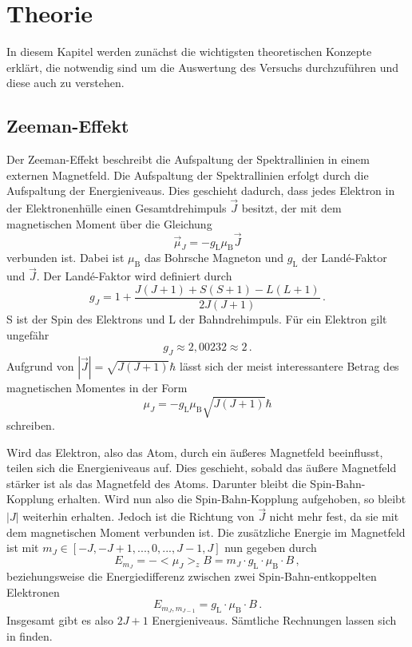 \section{Theorie}
\label{sec:Theorie}

In diesem Kapitel werden zunächst die wichtigsten theoretischen Konzepte erklärt, die notwendig sind um die Auswertung des Versuchs durchzuführen
und diese auch zu verstehen.

\subsection{Zeeman-Effekt}

Der Zeeman-Effekt beschreibt die Aufspaltung der Spektrallinien in einem externen Magnetfeld.
Die Aufspaltung der Spektrallinien erfolgt durch die Aufspaltung der Energieniveaus.
Dies geschieht dadurch, dass jedes Elektron in der Elektronenhülle einen Gesamtdrehimpuls $\vec{J}$ besitzt,
der mit dem magnetischen Moment über die Gleichung
\begin{equation*}
    \vec{\mu}_J = - g_\text{L} \mu_\text{B} \vec{J}
\end{equation*}
verbunden ist.
Dabei ist $\mu_\text{B}$ das Bohrsche Magneton und $g_\text{L}$ der Landé-Faktor und $\vec{J}$.
Der Landé-Faktor wird definiert durch 
\begin{equation} \label{eq:g_J}
    g_J = 1 + \frac{J(J+1) + S(S+1) - L(L+1)}{2 J(J+1)} \, .
\end{equation}
S ist der Spin des Elektrons und L der Bahndrehimpuls.
Für ein Elektron gilt ungefähr
\begin{equation*}
    g_J \approx 2,00232 \approx 2 \, .
\end{equation*}
Aufgrund von $|\vec{J}| = \sqrt{J(J+1)} \hbar$ lässt sich der meist interessantere Betrag des magnetischen Momentes in der Form
\begin{equation*}
   \mu_J = - g_\text{L} \mu_\text{B} \sqrt{J(J+1)} \hbar
\end{equation*}
schreiben.

Wird das Elektron, also das Atom, durch ein äußeres Magnetfeld beeinflusst, teilen sich die Energieniveaus auf.
Dies geschieht, sobald das äußere Magnetfeld stärker ist als das Magnetfeld des Atoms.
Darunter bleibt die Spin-Bahn-Kopplung erhalten.
Wird nun also die Spin-Bahn-Kopplung aufgehoben, so bleibt $|J|$ weiterhin erhalten.
Jedoch ist die Richtung von $\vec{J}$ nicht mehr fest, da sie mit dem magnetischen Moment verbunden ist.
Die zusätzliche Energie im Magnetfeld ist mit $m_J \in [-J, -J+1,...,0,...,J-1, J]$ nun gegeben durch
\begin{equation}
    E_{m_J} = - <\mu_J>_z B = m_J \cdot g_\text{L} \cdot \mu_\text{B} \cdot B \, ,
\end{equation}
beziehungsweise die Energiedifferenz zwischen zwei Spin-Bahn-entkoppelten Elektronen
\begin{equation}
    E_{m_J,m_{J-1}} = g_\text{L} \cdot \mu_\text{B}\cdot B \, .
\end{equation}
Insgesamt gibt es also $2J+1$ Energieniveaus.
Sämtliche Rechnungen lassen sich in \cite{demtroeder3} finden.


